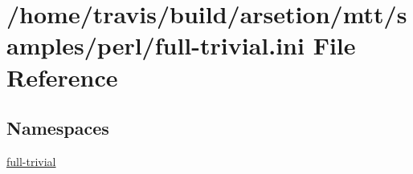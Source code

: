 \hypertarget{full-trivial_8ini}{\section{/home/travis/build/arsetion/mtt/samples/perl/full-\/trivial.ini File Reference}
\label{full-trivial_8ini}
}
\subsection*{Namespaces}
\begin{DoxyCompactItemize}
\item 
\hyperlink{namespacefull-trivial}{full-\/trivial}
\end{DoxyCompactItemize}
